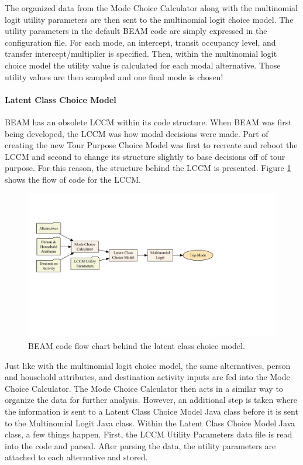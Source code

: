 \documentclass[3p, authoryear, review]{elsarticle} %
\begin{document}
The organized data from the Mode Choice Calculator along with the multinomial logit utility parameters are then sent to the multinomial logit choice model. The utility parameters in the default BEAM code are simply expressed in the configuration file. For each mode, an intercept, transit occupancy level, and transfer intercept/multiplier is specified. Then, within the multinomial logit choice model the utility value is calculated for each modal alternative. Those utility values are then sampled and one final mode is chosen!

\hypertarget{latent-class-choice-model}{%
\paragraph{Latent Class Choice Model}\label{latent-class-choice-model}}

BEAM has an obsolete LCCM within its code structure. When BEAM was first being developed, the LCCM was how modal decisions were made. Part of creating the new Tour Purpose Choice Model was first to recreate and reboot the LCCM and second to change its structure slightly to base decisions off of tour purpose. For this reason, the structure behind the LCCM is presented. Figure \ref{fig:lccmflow} shows the flow of code for the LCCM.

\begin{figure}

{\centering \includegraphics{thesis_files/figure-latex/lccmflow-1} 

}

\caption{BEAM code flow chart behind the latent class choice model.}\label{fig:lccmflow}
\end{figure}

Just like with the multinomial logit choice model, the same alternatives, person and household attributes, and destination activity inputs are fed into the Mode Choice Calculator. The Mode Choice Calculator then acts in a similar way to organize the data for further analysis. However, an additional step is taken where the information is sent to a Latent Class Choice Model Java class before it is sent to the Multinomial Logit Java class. Within the Latent Class Choice Model Java class, a few things happen. First, the LCCM Utility Parameters data file is read into the code and parsed. After parsing the data, the utility parameters are attached to each alternative and stored.
\end{document}
